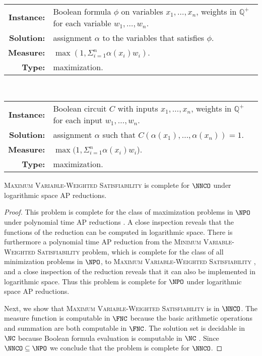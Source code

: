 \begin{definition}
  \mbox{} \\
  \begin{tabular}{r p{9.5cm}}
    \textbf{Instance:} & Boolean formula $\phi$ on variables $x_1, \dotsc, x_n$, weights in $\mathbb{Q}^+$ for each variable $w_1, \dotsc, w_n$. \\
    \textbf{Solution:} & assignment $\alpha$ to the variables that satisfies $\phi$. \\
    \textbf{Measure:} & $\max(1, \Sigma_{i = 1}^n \alpha(x_i) w_i)$. \\
    \textbf{Type:} & maximization.
  \end{tabular}
\end{definition}

\begin{definition}
  \mbox{} \\
  \begin{tabular}{r p{9.5cm}}
    \textbf{Instance:} & Boolean circuit $C$ with inputs $x_1, \dotsc, x_n$, weights in $\mathbb{Q}^+$ for each input $w_1, \dotsc, w_n$. \\
    \textbf{Solution:} & assignment $\alpha$ such that $C(\alpha(x_1), \dotsc, \alpha(x_n)) = 1$. \\
    \textbf{Measure:} & $\max(1, \Sigma_{i = 1}^n \alpha(x_i) w_i$). \\
    \textbf{Type:} & maximization.
  \end{tabular}
\end{definition}

\begin{theorem}
  \textsc{Maximum Variable-Weighted Satisfiability} is complete for $\NNCO$ under logarithmic space AP reductions.
\end{theorem}
\begin{proof}
  This problem is complete for the class of maximization problems in $\NPO$ under polynomial time AP reductions \cite[Theorem~3.1]{om87}.
  A close inspection reveals that the functions of the reduction can be computed in logarithmic space.
  There is furthermore a polynomial time AP reduction from the \textsc{Minimum Variable-Weighted Satisfiability} problem, which is complete for the class of all minimization problems in $\NPO$, to \textsc{Maximum Variable-Weighted Satisfiability} \cite[Theorem~8.4]{acgkmp99}, and a close inspection of the reduction reveals that it can also be implemented in logarithmic space.
  Thus this problem is complete for $\NPO$ under logarithmic space AP reductions.

  Next, we show that \textsc{Maximum Variable-Weighted Satisfiability} is in $\NNCO$.
  The measure function is computable in $\FNC$ because the basic arithmetic operations and summation are both computable in $\FNC$.
  The solution set is decidable in $\NC$ because Boolean formula evaluation is computable in $\NC$ \cite{buss87}.
  Since $\NNCO \subseteq \NPO$ we conclude that the problem is complete for $\NNCO$.
\end{proof}


